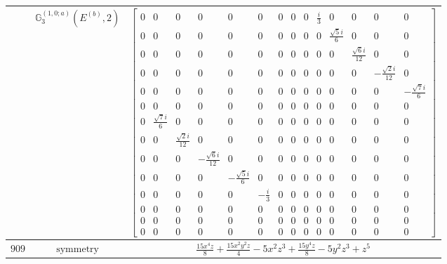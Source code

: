 \documentclass[fleqn,8pt,landscape]{jsarticle}
\begin{document}
\begin{longtable}{ccc}
$  $ & $ \mathbb{G}_{3}^{(1,0;a)}(E^{(b)},2) $ & $ \begin{bmatrix} 0 & 0 & 0 & 0 & 0 & 0 & 0 & 0 & 0 & \frac{i}{3} & 0 & 0 & 0 & 0 \\ 0 & 0 & 0 & 0 & 0 & 0 & 0 & 0 & 0 & 0 & \frac{\sqrt{5} i}{6} & 0 & 0 & 0 \\ 0 & 0 & 0 & 0 & 0 & 0 & 0 & 0 & 0 & 0 & 0 & \frac{\sqrt{6} i}{12} & 0 & 0 \\ 0 & 0 & 0 & 0 & 0 & 0 & 0 & 0 & 0 & 0 & 0 & 0 & - \frac{\sqrt{2} i}{12} & 0 \\ 0 & 0 & 0 & 0 & 0 & 0 & 0 & 0 & 0 & 0 & 0 & 0 & 0 & - \frac{\sqrt{7} i}{6} \\ 0 & 0 & 0 & 0 & 0 & 0 & 0 & 0 & 0 & 0 & 0 & 0 & 0 & 0 \\ 0 & \frac{\sqrt{7} i}{6} & 0 & 0 & 0 & 0 & 0 & 0 & 0 & 0 & 0 & 0 & 0 & 0 \\ 0 & 0 & \frac{\sqrt{2} i}{12} & 0 & 0 & 0 & 0 & 0 & 0 & 0 & 0 & 0 & 0 & 0 \\ 0 & 0 & 0 & - \frac{\sqrt{6} i}{12} & 0 & 0 & 0 & 0 & 0 & 0 & 0 & 0 & 0 & 0 \\ 0 & 0 & 0 & 0 & - \frac{\sqrt{5} i}{6} & 0 & 0 & 0 & 0 & 0 & 0 & 0 & 0 & 0 \\ 0 & 0 & 0 & 0 & 0 & - \frac{i}{3} & 0 & 0 & 0 & 0 & 0 & 0 & 0 & 0 \\ 0 & 0 & 0 & 0 & 0 & 0 & 0 & 0 & 0 & 0 & 0 & 0 & 0 & 0 \\ 0 & 0 & 0 & 0 & 0 & 0 & 0 & 0 & 0 & 0 & 0 & 0 & 0 & 0 \\ 0 & 0 & 0 & 0 & 0 & 0 & 0 & 0 & 0 & 0 & 0 & 0 & 0 & 0 \end{bmatrix} $ \\ \hline
$ 909 $ & $ \text{symmetry} $ & $ \frac{15 x^{4} z}{8} + \frac{15 x^{2} y^{2} z}{4} - 5 x^{2} z^{3} + \frac{15 y^{4} z}{8} - 5 y^{2} z^{3} + z^{5} $ \\

\end{longtable}
\end{document}
